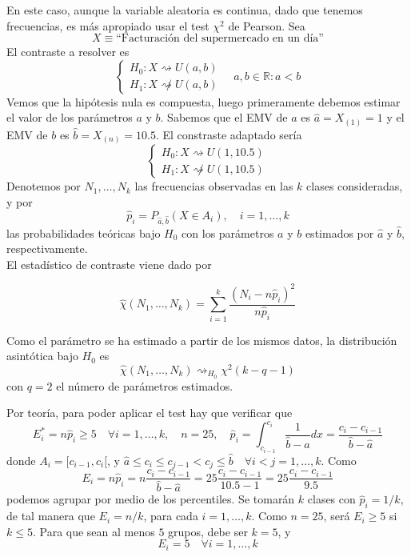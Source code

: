 \documentclass[12pt]{article}
\newcommand{\R}{\mathbb{R}}
\begin{document}
\begin{ejercicio}[1.5 puntos]
\begin{enumerate}
            En este caso, aunque la variable aleatoria es continua, dado que tenemos frecuencias, es más apropiado usar el test $\chi^2$ de Pearson.
            Sea $$X \equiv \text{``Facturación del supermercado en un día''}$$ El contraste a resolver es
            $$\begin{cases}
                H_0 : X \rightsquigarrow U(a,b) \\
                H_1 : X \not\rightsquigarrow U(a,b)
            \end{cases} \quad a,b \in \R : a < b$$
            Vemos que la hipótesis nula es compuesta, luego primeramente debemos estimar el valor de los parámetros $a$ y $b$. 
            Sabemos que el EMV de $a$ es $\hat{a} = X_{(1)} = 1$ y el EMV de $b$ es $\hat{b} = X_{(n)} = 10.5$. El constraste adaptado sería 
            $$\begin{cases}
                H_0 : X \rightsquigarrow U(1,10{.}5) \\
                H_1 : X \not\rightsquigarrow U(1,10{.}5)
            \end{cases}$$
            Denotemos por $N_1, \ldots, N_k$ las frecuencias observadas en las $k$ clases consideradas, y por
            $$\hat{p}_i = P_{\hat{a}, \hat{b}}(X \in A_i), \quad i = 1, \ldots, k$$
            las probabilidades teóricas bajo $H_0$ con los parámetros $a$ y $b$ estimados por $\hat{a}$ y $\hat{b}$, respectivamente. \\

            El estadístico de contraste viene dado por

            $$\hat{\chi}(N_1, \ldots, N_k) = \sum_{i=1}^k \dfrac{(N_i - n \hat{p}_i)^2}{n \hat{p}_i}$$

            Como el parámetro se ha estimado a partir de los mismos datos, la distribución asintótica bajo $H_0$ es 
            $$\hat{\chi}(N_1, \ldots, N_k) \rightsquigarrow_{H_0} \chi^2(k - q - 1)$$
            con $q=2$ el número de parámetros estimados.

            Por teoría, para poder aplicar el test hay que verificar que $$E^*_{i} = n\hat{p}_i \geqslant 5 \quad \forall i = 1, \ldots, k, \quad n = 25, \quad \hat{p}_i = \int_{c_{i-1}}^{c_i} \dfrac{1}{\hat{b} - \hat{a}}dx = 
            \dfrac{c_{i} - c_{i-1}}{\hat{b} - \hat{a}}$$
            donde $A_i = [c_{i-1}, c_i[$, y $\hat{a} \leq c_{i} \leq c_{j-1} < c_j \leq \hat{b} \quad \forall i<j = 1, \ldots, k$. Como 
            $$E_i = n\hat{p}_i = n \dfrac{c_{i} - c_{i-1}}{\hat{b} - \hat{a}} = 25 \dfrac{c_{i} - c_{i-1}}{10.5 - 1} = 25 \dfrac{c_{i} - c_{i-1}}{9.5}$$
            podemos agrupar por medio de los percentiles. Se tomarán $k$ clases con $\hat{p}_i = 1 / k$, de tal manera que $E_i = n / k$, para cada $i = 1, \ldots, k$. 
            Como $n = 25$, será $E_i \geq 5$ si $k \leq 5$. Para que sean al menos $5$ grupos, debe ser $k=5$, y
            $$E_i = 5 \quad \forall i = 1, \ldots, k$$


\end{enumerate}
\end{ejercicio}
\end{document}
